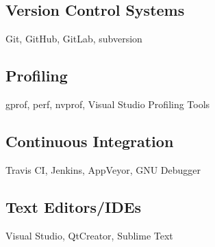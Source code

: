 
\subsection{Version Control Systems}
Git, GitHub, GitLab, subversion

\subsection{Profiling}
gprof, perf, nvprof, Visual Studio Profiling Tools

\subsection{Continuous Integration}
Travis CI, Jenkins, AppVeyor, GNU Debugger

\subsection{Text Editors/IDEs}
Visual Studio, QtCreator, Sublime Text

